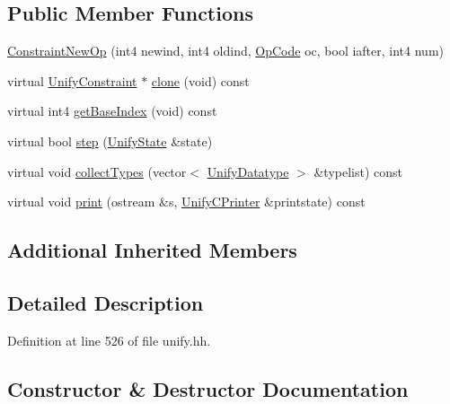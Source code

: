 \subsection*{Public Member Functions}
\begin{DoxyCompactItemize}
\item 
\mbox{\hyperlink{class_constraint_new_op_a9396e173813e0869d859cd37dafbd541}{Constraint\+New\+Op}} (int4 newind, int4 oldind, \mbox{\hyperlink{opcodes_8hh_abeb7dfb0e9e2b3114e240a405d046ea7}{Op\+Code}} oc, bool iafter, int4 num)
\item 
virtual \mbox{\hyperlink{class_unify_constraint}{Unify\+Constraint}} $\ast$ \mbox{\hyperlink{class_constraint_new_op_a5a9a1b594f9843f8365dfaaaa836675e}{clone}} (void) const
\item 
virtual int4 \mbox{\hyperlink{class_constraint_new_op_aa1984f7dcd80598f9c39a9ea6a28b29d}{get\+Base\+Index}} (void) const
\item 
virtual bool \mbox{\hyperlink{class_constraint_new_op_a53678f806d79236bb280167323593063}{step}} (\mbox{\hyperlink{class_unify_state}{Unify\+State}} \&state)
\item 
virtual void \mbox{\hyperlink{class_constraint_new_op_a00605633396f06a8eef9493beb5d831e}{collect\+Types}} (vector$<$ \mbox{\hyperlink{class_unify_datatype}{Unify\+Datatype}} $>$ \&typelist) const
\item 
virtual void \mbox{\hyperlink{class_constraint_new_op_ad247112189d345a7d7ddf7c785514d56}{print}} (ostream \&s, \mbox{\hyperlink{class_unify_c_printer}{Unify\+C\+Printer}} \&printstate) const
\end{DoxyCompactItemize}
\subsection*{Additional Inherited Members}


\subsection{Detailed Description}


Definition at line 526 of file unify.\+hh.



\subsection{Constructor \& Destructor Documentation}
\mbox{\label{class_constraint_new_op_a9396e173813e0869d859cd37dafbd541}} 
